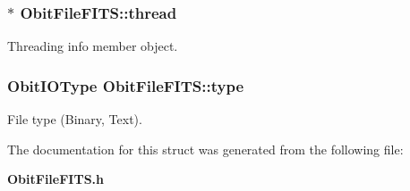 \subsubsection{$\ast$ {\bf Obit\-File\-FITS::thread}}\label{structObitFileFITS_o4}


Threading info member object. 

\subsubsection{\setlength{\rightskip}{0pt plus 5cm}Obit\-IOType {\bf Obit\-File\-FITS::type}}\label{structObitFileFITS_o6}


File type (Binary, Text). 



The documentation for this struct was generated from the following file:\begin{CompactItemize}
\item 
{\bf Obit\-File\-FITS.h}\end{CompactItemize}
